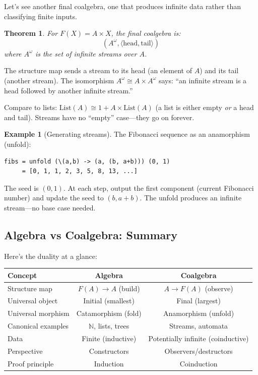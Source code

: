 \documentclass[11pt]{article}
\newcommand{\N}{\mathbb{N}}
\theoremstyle{definition}
\newtheorem{example}{Example}[section]
\theoremstyle{plain}
\newtheorem{theorem}{Theorem}[section]
\theoremstyle{remark}
\begin{document}
Let's see another final coalgebra, one that produces infinite data rather than classifying finite inputs.

\begin{theorem}
For $F(X) = A \times X$, the final coalgebra is:
\[
(A^\omega, \langle \text{head}, \text{tail} \rangle)
\]
where $A^\omega$ is the set of infinite streams over $A$.
\end{theorem}

The structure map sends a stream to its head (an element of $A$) and its tail (another stream). The isomorphism $A^\omega \cong A \times A^\omega$ says: ``an infinite stream is a head followed by another infinite stream.''

Compare to lists: $\text{List}(A) \cong 1 + A \times \text{List}(A)$ (a list is either empty \emph{or} a head and tail). Streams have no ``empty'' case---they go on forever.

\begin{example}[Generating streams]
The Fibonacci sequence as an anamorphism (unfold):
\begin{verbatim}
fibs = unfold (\(a,b) -> (a, (b, a+b))) (0, 1)
     = [0, 1, 1, 2, 3, 5, 8, 13, ...]
\end{verbatim}
The seed is $(0, 1)$. At each step, output the first component (current Fibonacci number) and update the seed to $(b, a+b)$. The unfold produces an infinite stream---no base case needed.
\end{example}

\subsection{Algebra vs Coalgebra: Summary}

Here's the duality at a glance:

\begin{center}
\begin{tabular}{lcc}
\textbf{Concept} & \textbf{Algebra} & \textbf{Coalgebra} \\
\hline
Structure map & $F(A) \to A$ (build) & $A \to F(A)$ (observe) \\
Universal object & Initial (smallest) & Final (largest) \\
Universal morphism & Catamorphism (fold) & Anamorphism (unfold) \\
Canonical examples & $\N$, lists, trees & Streams, automata \\
Data & Finite (inductive) & Potentially infinite (coinductive) \\
Perspective & Constructors & Observers/destructors \\
Proof principle & Induction & Coinduction \\
\end{tabular}
\end{center}
\end{document}
